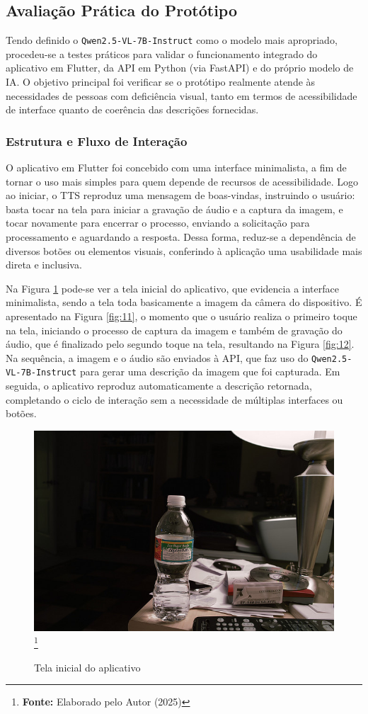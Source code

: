 \subsection{Avaliação Prática do Protótipo}

Tendo definido o \texttt{Qwen2.5-VL-7B-Instruct} como o modelo mais apropriado, procedeu-se a testes práticos para validar o funcionamento integrado do aplicativo em Flutter, da API em Python (via FastAPI) e do próprio modelo de IA. O objetivo principal foi verificar se o protótipo realmente atende às necessidades de pessoas com deficiência visual, tanto em termos de acessibilidade de interface quanto de coerência das descrições fornecidas.

\subsubsection{Estrutura e Fluxo de Interação}

O aplicativo em Flutter foi concebido com uma interface minimalista, a fim de tornar o uso mais simples para quem depende de recursos de acessibilidade. Logo ao iniciar, o TTS reproduz uma mensagem de boas-vindas, instruindo o usuário: basta tocar na tela para iniciar a gravação de áudio e a captura da imagem, e tocar novamente para encerrar o processo, enviando a solicitação para processamento e aguardando a resposta. Dessa forma, reduz-se a dependência de diversos botões ou elementos visuais, conferindo à aplicação uma usabilidade mais direta e inclusiva.

Na Figura \ref{fig:10} pode-se ver a tela inicial do aplicativo, que evidencia a interface minimalista, sendo a tela toda basicamente a imagem da câmera do dispositivo. É apresentado na Figura \ref{fig:11}, o momento que o usuário realiza o primeiro toque na tela, iniciando o processo de captura da imagem e também de gravação do áudio, que é finalizado pelo segundo toque na tela, resultando na Figura \ref{fig:12}. Na sequência, a imagem e o áudio são enviados à API, que faz uso do \texttt{Qwen2.5-VL-7B-Instruct} para gerar uma descrição da imagem que foi capturada. Em seguida, o aplicativo reproduz automaticamente a descrição retornada, completando o ciclo de interação sem a necessidade de múltiplas interfaces ou botões.

\begin{figure}[!ht]
     \caption{Tela inicial do aplicativo}
     \centering
     \includegraphics[width=0.7\linewidth]{imagens/garrafa.jpg}
     \label{fig:10}
     \footnote{\textbf{Fonte:} Elaborado pelo Autor (2025)}
\end{figure}

